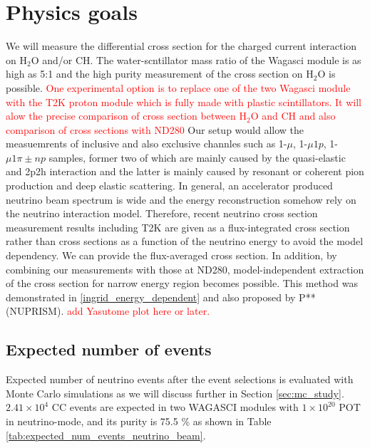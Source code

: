 \section{Physics goals}
We will measure the differential cross section for the charged current interaction on $\mathrm{H_2O}$ and/or CH.
The water-scntillator mass ratio of the Wagasci module is as high as 5:1 and the high purity measurement
of the cross section on $\mathrm{H_2O}$ is possible.
\textcolor{red}{One experimental option is to replace one of the two Wagasci module with the T2K proton module
  which is fully made with plastic scintillators. It will alow the precise comparison
  of cross section between $\mathrm{H_2O}$ and CH and also comparison of cross sections with ND280}
Our setup would allow the measuemrents of inclusive and also exclusive channles such as
1-$\mu$, 1-$\mu 1p$, 1-$\mu 1\pi{\pm} np$ samples, former two of which are mainly caused by the quasi-elastic and
2p2h interaction and the latter is mainly caused by resonant or coherent pion production and deep elastic scattering.
In general, an accelerator produced neutrino beam spectrum is wide and the energy reconstruction
somehow rely on the neutrino interaction model.
Therefore, recent neutrino cross section measurement results including T2K are given as a flux-integrated cross section
rather than cross sections as a function of the neutrino energy to avoid the model dependency.
We can provide the flux-averaged cross section.
In addition, by combining our measurements with those at ND280, model-independent extraction of the cross section
for narrow energy region becomes possible.
This method was demonstrated in \ref{ingrid_energy_dependent} and also proposed by P** (NUPRISM).
\textcolor{red}{add Yasutome plot here or later.}


\subsection{Expected number of events}
Expected number of neutrino events after the event selections is evaluated with Monte Carlo simulations as we will discuss further in Section \ref{sec:mc_study}.
$2.41 \times 10^{4}$ CC events are expected in two WAGASCI modules with $1\times 10^{20}$ POT in neutrino-mode, and its purity is 75.5 \% as shown in Table \ref{tab:expected_num_events_neutrino_beam}.

